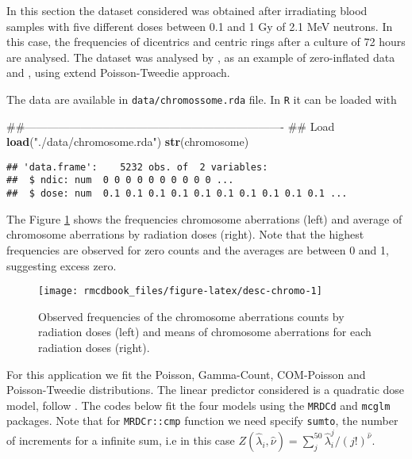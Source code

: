 \documentclass[9pt,a5paper,]{book}
\newenvironment{Shaded}{}{}
\newcommand{\KeywordTok}[1]{\textbf{{#1}}}
\newcommand{\StringTok}[1]{{#1}}
\newcommand{\NormalTok}[1]{{#1}}
\renewenvironment{Shaded}{\color{inputcolor}}{}
\theoremstyle{definition}
\theoremstyle{definition}
\theoremstyle{remark}
\begin{document}
In this section the dataset considered was obtained after irradiating
blood samples with five different doses between 0.1 and 1 Gy of 2.1 MeV
neutrons. In this case, the frequencies of dicentrics and centric rings
after a culture of 72 hours are analysed. The dataset was analysed by
\citet{Oliveira2006}, as an example of zero-inflated data and
\citet{Bonat2016b}, using extend Poisson-Tweedie approach.

The data are available in \texttt{data/chromossome.rda} file. In
\texttt{R} it can be loaded with

\begin{Shaded}
\begin{Highlighting}[]
\NormalTok{##----------------------------------------------------------------------}
\NormalTok{## Load}
\KeywordTok{load}\NormalTok{(}\StringTok{"./data/chromosome.rda"}\NormalTok{)}
\KeywordTok{str}\NormalTok{(chromosome)}
\end{Highlighting}
\end{Shaded}

\begin{verbatim}
## 'data.frame':    5232 obs. of  2 variables:
##  $ ndic: num  0 0 0 0 0 0 0 0 0 0 ...
##  $ dose: num  0.1 0.1 0.1 0.1 0.1 0.1 0.1 0.1 0.1 0.1 ...
\end{verbatim}

The Figure \ref{fig:desc-chromo} shows the frequencies chromosome
aberrations (left) and average of chromosome aberrations by radiation
doses (right). Note that the highest frequencies are observed for zero
counts and the averages are between 0 and 1, suggesting excess zero.

\begin{figure}[h]

{\centering \texttt{[image: rmcdbook\_files/figure-latex/desc-chromo-1]} 

}

\caption{Observed frequencies of the chromosome aberrations counts by radiation doses (left) and means of chromosome aberrations for each radiation doses (right).}\label{fig:desc-chromo}
\end{figure}

For this application we fit the Poisson, Gamma-Count, COM-Poisson and
Poisson-Tweedie distributions. The linear predictor considered is a
quadratic dose model, follow \citet{Bonat2016b}. The codes below fit the
four models using the \texttt{MRDCd} and \texttt{mcglm} packages. Note
that for \texttt{MRDCr::cmp} function we need specify \texttt{sumto},
the number of increments for a infinite sum, i.e in this case
\(Z(\hat{\lambda}_i, \hat{\nu}) = \sum_j^{50}\hat{\lambda}_i^j / (j!)^{\hat{\nu}}\).
\end{document}
